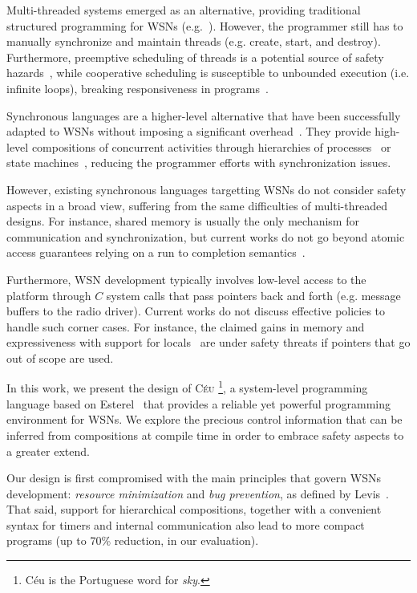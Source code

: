 \documentclass[10pt]{sensys-proc}
\newcommand{\CEU}{\textsc{C\'{e}u}\xspace}
\begin{document}
Multi-threaded systems emerged as an alternative, providing traditional 
structured programming for WSNs (e.g.~\cite{wsn.protothreads,wsn.mantisos}).
However, the programmer still has to manually synchronize and maintain threads 
(e.g. create, start, and destroy).
Furthermore, preemptive scheduling of threads is a potential source of safety 
hazards~\cite{sync_async.threadsproblems}, while cooperative scheduling is 
susceptible to unbounded execution (i.e. infinite loops), breaking 
responsiveness in programs~\cite{wsn.comparison}.

Synchronous languages are a higher-level alternative that have been 
successfully adapted to WSNs without imposing a significant 
overhead~\cite{wsn.sol,wsn.osm}.
They provide high-level compositions of concurrent activities through 
hierarchies of processes~\cite{esterel.ieee91} or state 
machines~\cite{statecharts.visual}, reducing the programmer efforts with 
synchronization issues.

However, existing synchronous languages targetting WSNs do not consider safety 
aspects in a broad view, suffering from the same difficulties of multi-threaded 
designs.
For instance, shared memory is usually the only mechanism for communication and 
synchronization, but current works do not go beyond atomic access guarantees 
relying on a run to completion semantics~\cite{wsn.sol,wsn.osm}.

Furthermore, WSN development typically involves low-level access to the 
platform through $C$ system calls that pass pointers back and forth (e.g.  
message buffers to the radio driver).
Current works do not discuss effective policies to handle such corner cases.
For instance, the claimed gains in memory and expressiveness with support for 
locals~\cite{wsn.ocram,wsn.osm} are under safety threats if pointers that go 
out of scope are used.

In this work, we present the design of \CEU%
\footnote{C\'eu is the Portuguese word for \emph{sky}.}, a system-level 
programming language based on Esterel~\cite{esterel.ieee91} that provides a 
reliable yet powerful programming environment for WSNs.
We explore the precious control information that can be inferred from 
compositions at compile time in order to embrace safety aspects to a greater 
extend.

Our design is first compromised with the main principles that govern WSNs 
development: \emph{resource minimization} and \emph{bug prevention}, as defined 
by Levis~\cite{wsn.decade}.
That said, support for hierarchical compositions, together with a convenient 
syntax for timers and internal communication also lead to more compact programs 
(up to 70\% reduction, in our evaluation).
\end{document}
